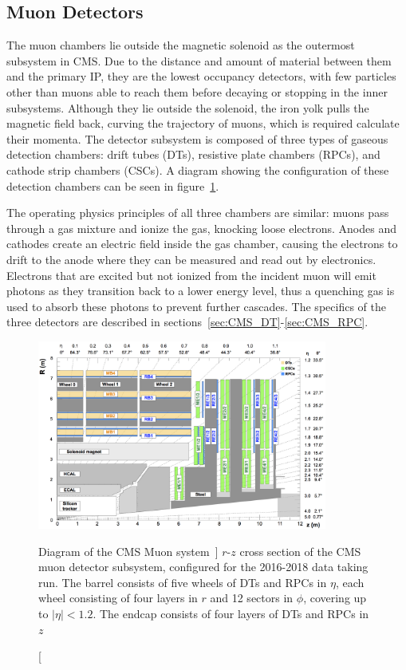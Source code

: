 \subsection{Muon Detectors} \label{sec:CMS_Muons}
The muon chambers lie outside the magnetic solenoid as the outermost subsystem in CMS. Due to the distance and amount of material between them and the primary IP, they are the lowest occupancy detectors, with few particles other than muons able to reach them before decaying or stopping in the inner subsystems. Although they lie outside the solenoid, the iron yolk pulls the magnetic field back, curving the trajectory of muons, which is required calculate their momenta. The detector subsystem is composed of three types of gaseous detection chambers: drift tubes (DTs), resistive plate chambers (RPCs), and cathode strip chambers (CSCs). A diagram showing the configuration of these detection chambers can be seen in figure~\ref{fig:Muons}.

The operating physics principles of all three chambers are similar: muons pass through a gas mixture and ionize the gas, knocking loose electrons. Anodes and cathodes create an electric field inside the gas chamber, causing the electrons to drift to the anode where they can be measured and read out by electronics. Electrons that are excited but not ionized from the incident muon will emit photons as they transition back to a lower energy level, thus a quenching gas is used to absorb these photons to prevent further cascades. The specifics of the three detectors are described in sections~\ref{sec:CMS_DT}-\ref{sec:CMS_RPC}.

\begin{figure}[htpb]
	\centering
	\includegraphics[width=0.85\textwidth]{figs/03_experiment/Muon_system.png}
	\caption
	[Diagram of the CMS Muon system~\cite{Sirunyan:2313130}]
	{$r$-$z$ cross section of the CMS muon detector subsystem, configured for the 2016-2018 data taking run. The barrel consists of five wheels of DTs and RPCs in $\eta$, each wheel consisting of four layers in $r$ and 12 sectors in $\phi$, covering up to $\left|\eta\right| < 1.2$. The endcap consists of four layers of DTs and RPCs in $z$~\cite{Sirunyan:2313130}}
	\label{fig:Muons}
\end{figure}

